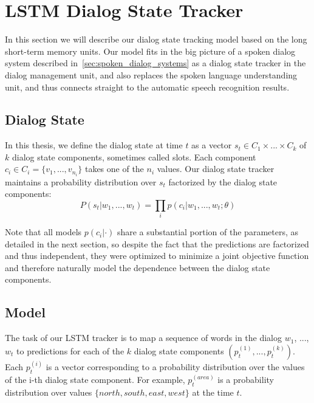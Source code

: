 \documentclass[10pt,twocolumn]{article}
\begin{document}
\section{LSTM Dialog State Tracker}
\label{sec:lstm_dialog_state_tracker}
In this section we will describe our dialog state tracking model based on the long short-term memory units. Our model fits in the big picture of a spoken dialog system described in~\autoref{sec:spoken_dialog_systems} as a dialog state tracker in the dialog management unit, and also replaces the spoken language understanding unit, and thus connects straight to the automatic speech recognition results.
\subsection{Dialog State}
In this thesis, we define the dialog state at time $t$ as a vector $s_t \in C_1 \times ... \times C_k$ of $k$ dialog state components, sometimes called slots. Each component $c_i \in C_i=\{v_1, ..., v_{n_i}\}$ takes one of the $n_i$ values. Our dialog state tracker maintains a probability distribution over $s_t$ factorized by the dialog state components:
$$P(s_t|w_1, ..., w_t)=\prod_i p(c_i|w_1, ..., w_t; \theta)$$

Note that all models $p(c_i|\cdot)$ share a substantial portion of the parameters, as detailed in the next section, so despite the fact that the predictions are factorized and thus independent, they were optimized to minimize a joint objective function and therefore naturally model the dependence between the dialog state components.

\subsection{Model}
The task of our LSTM tracker is to map a sequence of words in the dialog $w_1$, ..., $w_t$ to predictions for each of the $k$ dialog state components $(p^{(1)}_t, ..., p^{(k)}_t)$. Each $p^{(i)}_t$ is a vector corresponding to a probability distribution over the values of the i-th dialog state component. For example, $p^{(area)}_t$ is a probability distribution over values $\{north, south, east, west\}$ at the time $t$.
\end{document}
